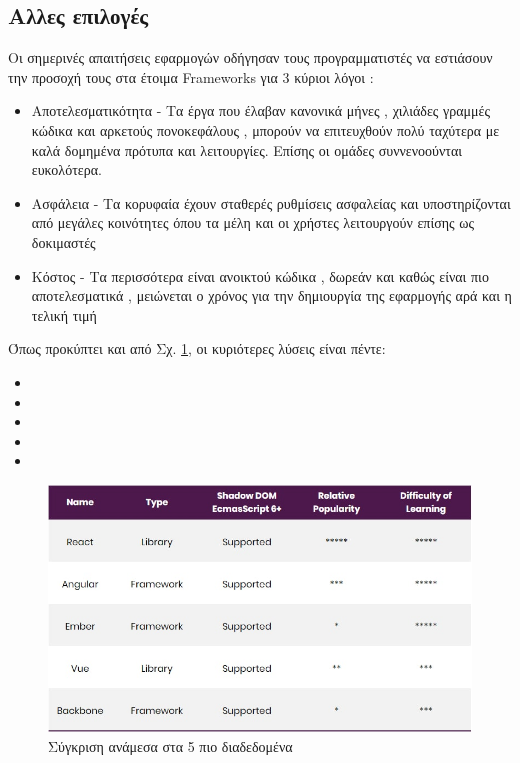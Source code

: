 \subsection*{Αλλες επιλογές}
Οι σημερινές απαιτήσεις εφαρμογών οδήγησαν τους προγραμματιστές να εστιάσουν την προσοχή τους στα έτοιμα \textlatin{Frameworks} για 3 κύριοι λόγοι : 
\begin{itemize}
    \item Αποτελεσματικότητα - Τα έργα που έλαβαν κανονικά μήνες , χιλιάδες γραμμές κώδικα και αρκετούς πονοκεφάλους , μπορούν να επιτευχθούν πολύ ταχύτερα με καλά δομημένα πρότυπα και λειτουργίες. Επίσης οι ομάδες συννενοούνται ευκολότερα.
    \item Ασφάλεια - Τα κορυφαία  έχουν σταθερές ρυθμίσεις ασφαλείας και υποστηρίζονται από μεγάλες κοινότητες όπου τα μέλη και οι χρήστες λειτουργούν επίσης ως δοκιμαστές
    \item Κόστος - Τα περισσότερα είναι ανοικτού κώδικα , δωρεάν και καθώς είναι πιο αποτελεσματικά , μειώνεται ο χρόνος για την δημιουργία της εφαρμογής αρά και η τελική τιμή
\end{itemize}
Όπως προκύπτει και από Σχ. \ref{fig:jsComparison}, οι κυριότερες λύσεις είναι πέντε:
\begin{itemize}
    \item {}
    \item {}
    \item {}
    \item {}
    \item {}
\end{itemize}
\begin{figure}[ht]
\centering
\includegraphics[scale=0.5]{images/comparisonJSFW.jpg}
\caption{Σύγκριση ανάμεσα στα 5 πιο διαδεδομένα }
\label{fig:jsComparison}
\end{figure}
